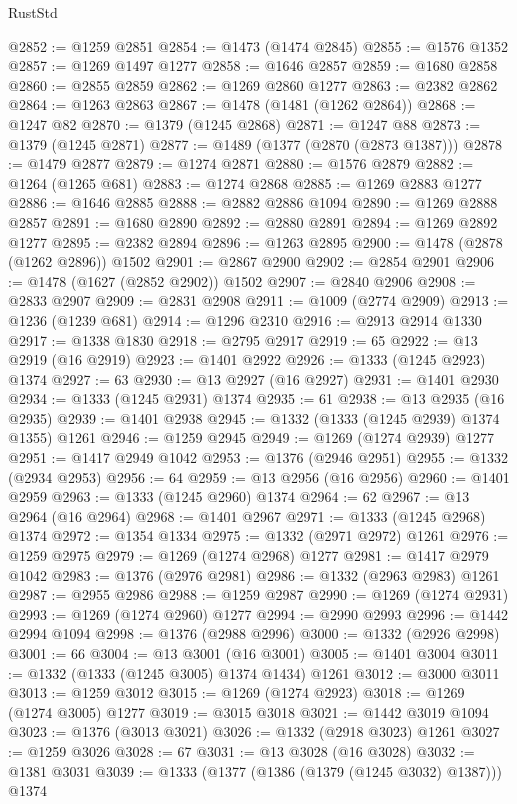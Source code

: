 \begin{lexlean}{RustStd}
\begin{coremodule}
@2852 := @1259 @2851
@2854 := @1473 (@1474 @2845)
@2855 := @1576 @1352
@2857 := @1269 @1497 @1277
@2858 := @1646 @2857
@2859 := @1680 @2858
@2860 := @2855 @2859
@2862 := @1269 @2860 @1277
@2863 := @2382 @2862
@2864 := @1263 @2863
@2867 := @1478 (@1481 (@1262 @2864))
@2868 := @1247 @82
@2870 := @1379 (@1245 @2868)
@2871 := @1247 @88
@2873 := @1379 (@1245 @2871)
@2877 := @1489 (@1377 (@2870 (@2873 @1387)))
@2878 := @1479 @2877
@2879 := @1274 @2871
@2880 := @1576 @2879
@2882 := @1264 (@1265 @681)
@2883 := @1274 @2868
@2885 := @1269 @2883 @1277
@2886 := @1646 @2885
@2888 := @2882 @2886 @1094
@2890 := @1269 @2888 @2857
@2891 := @1680 @2890
@2892 := @2880 @2891
@2894 := @1269 @2892 @1277
@2895 := @2382 @2894
@2896 := @1263 @2895
@2900 := @1478 (@2878 (@1262 @2896)) @1502
@2901 := @2867 @2900
@2902 := @2854 @2901
@2906 := @1478 (@1627 (@2852 @2902)) @1502
@2907 := @2840 @2906
@2908 := @2833 @2907
@2909 := @2831 @2908
@2911 := @1009 (@2774 @2909)
@2913 := @1236 (@1239 @681)
@2914 := @1296 @2310
@2916 := @2913 @2914 @1330
@2917 := @1338 @1830
@2918 := @2795 @2917
@2919 := 65
@2922 := @13 @2919 (@16 @2919)
@2923 := @1401 @2922
@2926 := @1333 (@1245 @2923) @1374
@2927 := 63
@2930 := @13 @2927 (@16 @2927)
@2931 := @1401 @2930
@2934 := @1333 (@1245 @2931) @1374
@2935 := 61
@2938 := @13 @2935 (@16 @2935)
@2939 := @1401 @2938
@2945 := @1332 (@1333 (@1245 @2939) @1374 @1355) @1261
@2946 := @1259 @2945
@2949 := @1269 (@1274 @2939) @1277
@2951 := @1417 @2949 @1042
@2953 := @1376 (@2946 @2951)
@2955 := @1332 (@2934 @2953)
@2956 := 64
@2959 := @13 @2956 (@16 @2956)
@2960 := @1401 @2959
@2963 := @1333 (@1245 @2960) @1374
@2964 := 62
@2967 := @13 @2964 (@16 @2964)
@2968 := @1401 @2967
@2971 := @1333 (@1245 @2968) @1374
@2972 := @1354 @1334
@2975 := @1332 (@2971 @2972) @1261
@2976 := @1259 @2975
@2979 := @1269 (@1274 @2968) @1277
@2981 := @1417 @2979 @1042
@2983 := @1376 (@2976 @2981)
@2986 := @1332 (@2963 @2983) @1261
@2987 := @2955 @2986
@2988 := @1259 @2987
@2990 := @1269 (@1274 @2931)
@2993 := @1269 (@1274 @2960) @1277
@2994 := @2990 @2993
@2996 := @1442 @2994 @1094
@2998 := @1376 (@2988 @2996)
@3000 := @1332 (@2926 @2998)
@3001 := 66
@3004 := @13 @3001 (@16 @3001)
@3005 := @1401 @3004
@3011 := @1332 (@1333 (@1245 @3005) @1374 @1434) @1261
@3012 := @3000 @3011
@3013 := @1259 @3012
@3015 := @1269 (@1274 @2923)
@3018 := @1269 (@1274 @3005) @1277
@3019 := @3015 @3018
@3021 := @1442 @3019 @1094
@3023 := @1376 (@3013 @3021)
@3026 := @1332 (@2918 @3023) @1261
@3027 := @1259 @3026
@3028 := 67
@3031 := @13 @3028 (@16 @3028)
@3032 := @1381 @3031
@3039 := @1333 (@1377 (@1386 (@1379 (@1245 @3032) @1387))) @1374

\end{coremodule}
\end{lexlean}
